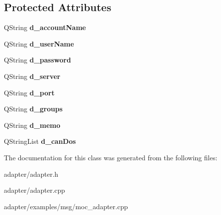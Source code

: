 \subsection*{Protected Attributes}
\begin{DoxyCompactItemize}
\item 
\hypertarget{classIMClient_ab37acf43e530eb2b1b08aac0c612d40f}{
QString {\bfseries d\_\-accountName}}
\label{classIMClient_ab37acf43e530eb2b1b08aac0c612d40f}

\item 
\hypertarget{classIMClient_a76ea05c466f863597e7becf7da0704f1}{
QString {\bfseries d\_\-userName}}
\label{classIMClient_a76ea05c466f863597e7becf7da0704f1}

\item 
\hypertarget{classIMClient_ad159062c1294eb3dad03fd64132ca991}{
QString {\bfseries d\_\-password}}
\label{classIMClient_ad159062c1294eb3dad03fd64132ca991}

\item 
\hypertarget{classIMClient_adce305eb1e03f58104960451476a26d7}{
QString {\bfseries d\_\-server}}
\label{classIMClient_adce305eb1e03f58104960451476a26d7}

\item 
\hypertarget{classIMClient_a4f807c21153728b60db53a05b36dd987}{
QString {\bfseries d\_\-port}}
\label{classIMClient_a4f807c21153728b60db53a05b36dd987}

\item 
\hypertarget{classIMClient_af859902b6ff51d784455d7c3a1b360b9}{
QString {\bfseries d\_\-groups}}
\label{classIMClient_af859902b6ff51d784455d7c3a1b360b9}

\item 
\hypertarget{classIMClient_a8fba519da9024ec5bbebee8819fbabb1}{
QString {\bfseries d\_\-memo}}
\label{classIMClient_a8fba519da9024ec5bbebee8819fbabb1}

\item 
\hypertarget{classIMClient_a5b09a04ecba698ecdf1529f7f755ade2}{
QStringList {\bfseries d\_\-canDos}}
\label{classIMClient_a5b09a04ecba698ecdf1529f7f755ade2}

\end{DoxyCompactItemize}


The documentation for this class was generated from the following files:\begin{DoxyCompactItemize}
\item 
adapter/adapter.h\item 
adapter/adapter.cpp\item 
adapter/examples/msg/moc\_\-adapter.cpp\end{DoxyCompactItemize}
